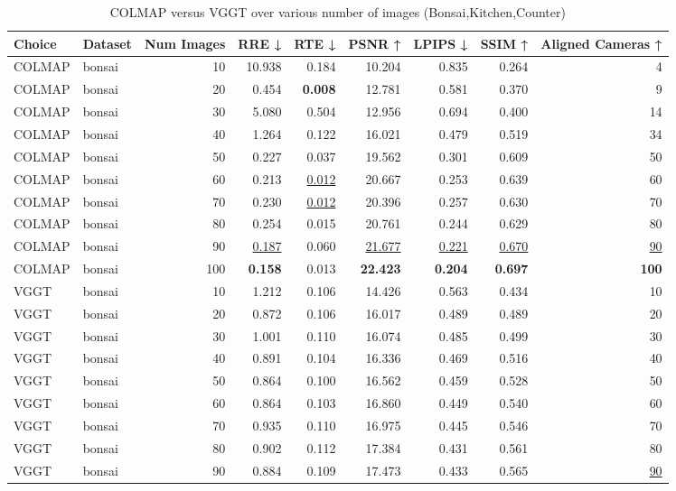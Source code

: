 \begin{table}[H]
\caption{COLMAP versus VGGT over various number of images (Bonsai,Kitchen,Counter)}
\label{tab:01_num_images_bonsai,kitchen,counter}
\small
\begin{tabular}{llrrrrrrr}
\toprule
Choice & Dataset & Num Images & RRE ↓ & RTE ↓ & PSNR ↑ & LPIPS ↓ & SSIM ↑ & Aligned Cameras ↑ \\
\midrule
COLMAP & bonsai & 10 & 10.938 & 0.184 & 10.204 & 0.835 & 0.264 & 4 \\
COLMAP & bonsai & 20 & 0.454 & \textbf{0.008} & 12.781 & 0.581 & 0.370 & 9 \\
COLMAP & bonsai & 30 & 5.080 & 0.504 & 12.956 & 0.694 & 0.400 & 14 \\
COLMAP & bonsai & 40 & 1.264 & 0.122 & 16.021 & 0.479 & 0.519 & 34 \\
COLMAP & bonsai & 50 & 0.227 & 0.037 & 19.562 & 0.301 & 0.609 & 50 \\
COLMAP & bonsai & 60 & 0.213 & \underline{0.012} & 20.667 & 0.253 & 0.639 & 60 \\
COLMAP & bonsai & 70 & 0.230 & \underline{0.012} & 20.396 & 0.257 & 0.630 & 70 \\
COLMAP & bonsai & 80 & 0.254 & 0.015 & 20.761 & 0.244 & 0.629 & 80 \\
COLMAP & bonsai & 90 & \underline{0.187} & 0.060 & \underline{21.677} & \underline{0.221} & \underline{0.670} & \underline{90} \\
COLMAP & bonsai & 100 & \textbf{0.158} & 0.013 & \textbf{22.423} & \textbf{0.204} & \textbf{0.697} & \textbf{100} \\
VGGT & bonsai & 10 & 1.212 & 0.106 & 14.426 & 0.563 & 0.434 & 10 \\
VGGT & bonsai & 20 & 0.872 & 0.106 & 16.017 & 0.489 & 0.489 & 20 \\
VGGT & bonsai & 30 & 1.001 & 0.110 & 16.074 & 0.485 & 0.499 & 30 \\
VGGT & bonsai & 40 & 0.891 & 0.104 & 16.336 & 0.469 & 0.516 & 40 \\
VGGT & bonsai & 50 & 0.864 & 0.100 & 16.562 & 0.459 & 0.528 & 50 \\
VGGT & bonsai & 60 & 0.864 & 0.103 & 16.860 & 0.449 & 0.540 & 60 \\
VGGT & bonsai & 70 & 0.935 & 0.110 & 16.975 & 0.445 & 0.546 & 70 \\
VGGT & bonsai & 80 & 0.902 & 0.112 & 17.384 & 0.431 & 0.561 & 80 \\
VGGT & bonsai & 90 & 0.884 & 0.109 & 17.473 & 0.433 & 0.565 & \underline{90} \\

\end{tabular}
\end{table}
